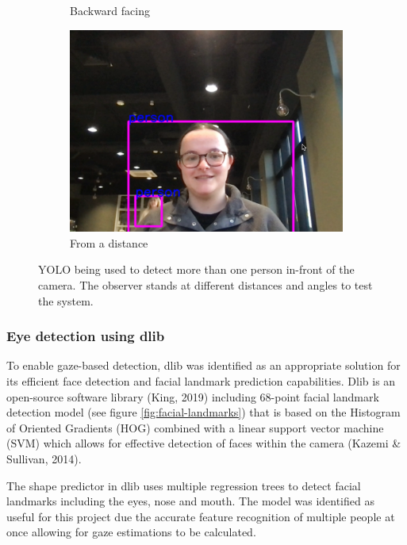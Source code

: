 \documentclass[12pt]{article}
\theoremstyle{plain}
\theoremstyle{definition}
\begin{document}
\begin{figure}[h!]
\begin{subfigure}[b]{0.3\textwidth}
         \caption{Backward facing}
         \label{fig:b}
     \end{subfigure}
     \hfill
     \begin{subfigure}[b]{0.3\textwidth}
         \centering
         \includegraphics[width=\textwidth]{img/fig1-img3.png}
         \caption{From a distance}
         \label{fig:c}
     \end{subfigure}
        \caption{YOLO being used to detect more than one person in-front of the camera. The observer stands at different distances and angles to test the system.}
        \label{fig:yolo}
\end{figure}

\subsubsection{Eye detection using dlib}
To enable gaze-based detection, dlib was identified as an appropriate solution for its efficient face detection and facial landmark prediction capabilities. Dlib is an open-source software library (King, 2019) including 68-point facial landmark detection model (see figure \ref{fig:facial-landmarks}) that is based on the Histogram of Oriented Gradients (HOG) combined with a linear support vector machine (SVM) which allows for effective detection of faces within the camera (Kazemi & Sullivan, 2014).

The shape predictor in dlib uses multiple regression trees to detect facial landmarks including the eyes, nose and mouth. The model was identified as useful for this project due the accurate feature recognition of multiple people at once allowing for gaze estimations to be calculated.
\end{document}
